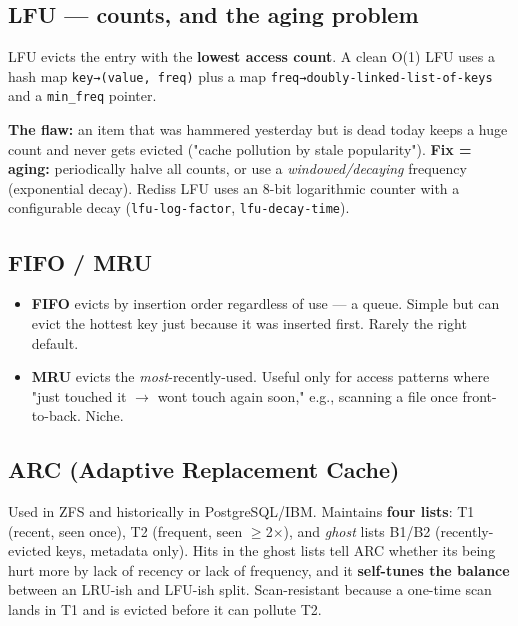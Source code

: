 \documentclass[11pt]{article}
\providecommand{\tightlist}{\setlength{\itemsep}{1pt}\setlength{\parskip}{0pt}}
\begin{document}
\subsection{LFU --- counts, and the aging problem}\label{lfu--counts-and-the-aging-problem}

LFU evicts the entry with the \textbf{lowest access count}. A clean O(1) LFU uses a hash map \texttt{key→(value,\ freq)} plus a map \texttt{freq→doubly-linked-list-of-keys} and a \texttt{min\_freq} pointer.

\textbf{The flaw:} an item that was hammered yesterday but is dead today keeps a huge count and never gets evicted ("cache pollution by stale popularity"). \textbf{Fix = aging:} periodically halve all counts, or use a \emph{windowed/decaying} frequency (exponential decay). Redis\textquotesingle s LFU uses an 8-bit logarithmic counter with a configurable decay (\texttt{lfu-log-factor}, \texttt{lfu-decay-time}).

\subsection{FIFO / MRU}\label{fifo--mru}

\begin{itemize}
\tightlist
\item
  \textbf{FIFO} evicts by insertion order regardless of use --- a queue. Simple but can evict the hottest key just because it was inserted first. Rarely the right default.
\item
  \textbf{MRU} evicts the \emph{most}-recently-used. Useful only for access patterns where "just touched it \(\rightarrow\) won\textquotesingle t touch again soon," e.g., scanning a file once front-to-back. Niche.
\end{itemize}

\subsection{ARC (Adaptive Replacement Cache)}\label{arc-adaptive-replacement-cache}

Used in ZFS and historically in PostgreSQL/IBM. Maintains \textbf{four lists}: T1 (recent, seen once), T2 (frequent, seen \(\geq\)2\(\times\)), and \emph{ghost} lists B1/B2 (recently-evicted keys, metadata only). Hits in the ghost lists tell ARC whether it\textquotesingle s being hurt more by lack of recency or lack of frequency, and it \textbf{self-tunes the balance} between an LRU-ish and LFU-ish split. Scan-resistant because a one-time scan lands in T1 and is evicted before it can pollute T2.
\end{document}
